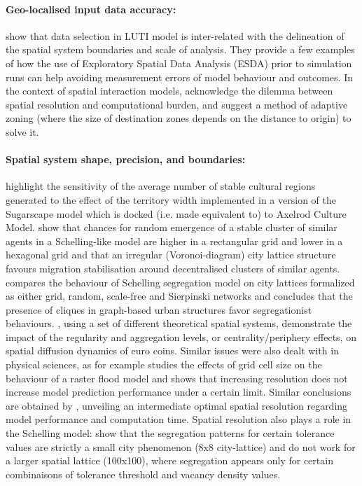 \documentclass[Royal,sageh,times]{sagej}
\begin{document}
\paragraph{Geo-localised input data accuracy:} \citet{Thomasetal2017} show that data selection in LUTI model is inter-related with the delineation of the spatial system boundaries and scale of analysis. They provide a few examples of how the use of Exploratory Spatial Data Analysis (ESDA) prior to simulation runs can help avoiding measurement errors of model behaviour and outcomes. In the context of spatial interaction models, \citet{hagen2012new} acknowledge the dilemma between spatial resolution and computational burden, and suggest a method of adaptive zoning (where the size of destination zones depends on the distance to origin) to solve it.

\paragraph{Spatial system shape, precision, and boundaries:} \citet{Axtelletal1996} highlight the sensitivity of the average number of stable cultural regions generated to the effect of the territory width implemented in a version of the Sugarscape model which is docked (i.e. made equivalent to) to Axelrod Culture Model. \citet{FlacheHegselmann2001} show that chances for random emergence of a stable cluster of similar agents in a Schelling-like model are higher in a rectangular grid and lower in a hexagonal grid and that an irregular (Voronoi-diagram) city lattice structure favours migration stabilisation around decentralised clusters of similar agents. \citet{Banos2012} compares the behaviour of Schelling segregation model on city lattices formalized as either grid, random, scale-free and Sierpinski networks and concludes that the presence of cliques in graph-based urban structures favor segregationist behaviours. \citet{LeTexierCaruso2017}, using a set of different theoretical spatial systems, demonstrate the impact of the regularity and aggregation levels, or centrality/periphery effects, on spatial diffusion dynamics of euro coins. Similar issues were also dealt with in physical sciences, as for example \cite{horritt2001effects} studies the effects of grid cell size on the behaviour of a raster flood model and shows that increasing resolution does not increase model prediction performance under a certain limit. Similar conclusions are obtained by \cite{vazquez2002effect}, unveiling an intermediate optimal spatial resolution regarding model performance and computation time. Spatial resolution also plays a role in the Schelling model: \citet{Singhetal2009} show that the segregation patterns for certain tolerance values are strictly a small city phenomenon (8x8 city-lattice) and do not work for a larger spatial lattice (100x100), where segregation appears only for certain combinaisons of tolerance threshold and vacancy density values.
\end{document}
